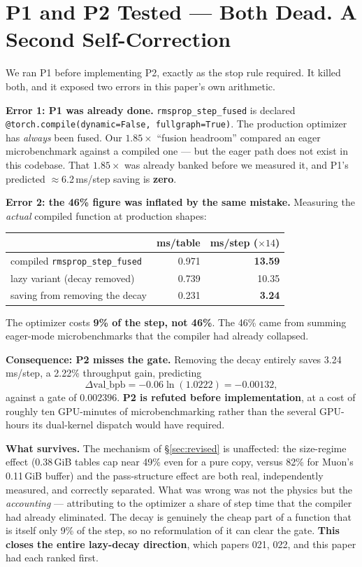 \documentclass{article}
\newcommand{\vb}{\mathrm{val\_bpb}}
\begin{document}
\section{P1 and P2 Tested --- Both Dead. A Second Self-Correction}
\label{sec:dead}
We ran P1 before implementing P2, exactly as the stop rule required. It killed both, and it exposed two errors in this paper's own arithmetic.

\textbf{Error 1: P1 was already done.} \texttt{rmsprop\_step\_fused} is declared \texttt{@torch.compile(dynamic=False, fullgraph=True)}. The production optimizer has \emph{always} been fused. Our $1.85\times$ ``fusion headroom'' compared an eager microbenchmark against a compiled one --- but the eager path does not exist in this codebase. That $1.85\times$ was already banked before we measured it, and P1's predicted $\approx$6.2\,ms/step saving is \textbf{zero}.

\textbf{Error 2: the 46\% figure was inflated by the same mistake.} Measuring the \emph{actual} compiled function at production shapes:
\begin{center}\begin{small}
\begin{tabular}{lrr}
\toprule
 & ms/table & ms/step ($\times14$) \\
\midrule
compiled \texttt{rmsprop\_step\_fused} & 0.971 & \textbf{13.59} \\
lazy variant (decay removed) & 0.739 & 10.35 \\
\midrule
saving from removing the decay & 0.231 & \textbf{3.24} \\
\bottomrule
\end{tabular}
\end{small}\end{center}
The optimizer costs \textbf{9\% of the step, not 46\%}. The 46\% came from summing eager-mode microbenchmarks that the compiler had already collapsed.

\textbf{Consequence: P2 misses the gate.} Removing the decay entirely saves 3.24\,ms/step, a 2.22\% throughput gain, predicting
\[
\Delta\vb = -0.06\ln(1.0222) = -0.00132,
\]
against a gate of $0.002396$. \textbf{P2 is refuted before implementation}, at a cost of roughly ten GPU-minutes of microbenchmarking rather than the several GPU-hours its dual-kernel dispatch would have required.

\textbf{What survives.} The mechanism of \S\ref{sec:revised} is unaffected: the size-regime effect (0.38\,GiB tables cap near 49\% even for a pure copy, versus 82\% for Muon's 0.11\,GiB buffer) and the pass-structure effect are both real, independently measured, and correctly separated. What was wrong was not the physics but the \emph{accounting} --- attributing to the optimizer a share of step time that the compiler had already eliminated. The decay is genuinely the cheap part of a function that is itself only 9\% of the step, so no reformulation of it can clear the gate. \textbf{This closes the entire lazy-decay direction}, which papers 021, 022, and this paper had each ranked first.
\end{document}
